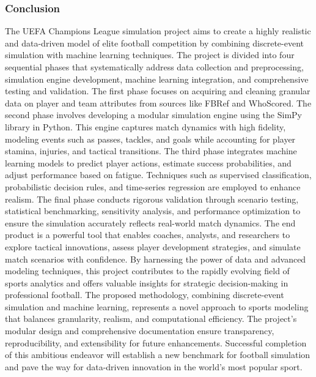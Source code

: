 \documentclass[12pt]{article}
\begin{document}
\subsubsection{Conclusion}
The UEFA Champions League simulation project aims to create a highly realistic and data-driven model of elite football competition by combining discrete-event simulation with machine learning techniques. The project is divided into four sequential phases that systematically address data collection and preprocessing, simulation engine development, machine learning integration, and comprehensive testing and validation.
The first phase focuses on acquiring and cleaning granular data on player and team attributes from sources like FBRef and WhoScored. The second phase involves developing a modular simulation engine using the SimPy library in Python. This engine captures match dynamics with high fidelity, modeling events such as passes, tackles, and goals while accounting for player stamina, injuries, and tactical transitions.
The third phase integrates machine learning models to predict player actions, estimate success probabilities, and adjust performance based on fatigue. Techniques such as supervised classification, probabilistic decision rules, and time-series regression are employed to enhance realism. The final phase conducts rigorous validation through scenario testing, statistical benchmarking, sensitivity analysis, and performance optimization to ensure the simulation accurately reflects real-world match dynamics.
The end product is a powerful tool that enables coaches, analysts, and researchers to explore tactical innovations, assess player development strategies, and simulate match scenarios with confidence. By harnessing the power of data and advanced modeling techniques, this project contributes to the rapidly evolving field of sports analytics and offers valuable insights for strategic decision-making in professional football.
The proposed methodology, combining discrete-event simulation and machine learning, represents a novel approach to sports modeling that balances granularity, realism, and computational efficiency. The project's modular design and comprehensive documentation ensure transparency, reproducibility, and extensibility for future enhancements. Successful completion of this ambitious endeavor will establish a new benchmark for football simulation and pave the way for data-driven innovation in the world's most popular sport.
\end{document}
